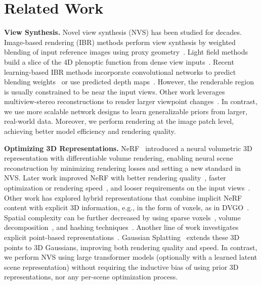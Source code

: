 
\vspace{-3mm}
\section{Related Work}
\label{related}
\vspace{-3mm}
\textbf{View Synthesis.} 
Novel view synthesis (NVS) has been studied for decades.
Image-based rendering (IBR) methods perform view synthesis by weighted blending of input reference images using proxy geometry~\citep{debevec2023modeling, heigl1999plenoptic, sinha2009piecewise}. Light field methods build a slice of the 4D plenoptic function from dense view inputs~\citep{gortler2023lumigraph, levoy2023light, davis2012unstructured}. Recent learning-based IBR methods incorporate convolutional networks to predict blending weights~\citep{hedman2018deep, zhou2016view, realestate10k_zhou2018stereo} or use predicted depth maps~\citep{choi2019extreme}. However, the renderable region is usually constrained to be near the input views. Other work leverages multiview-stereo reconstructions to render larger viewpoint changes~\citep{jancosek2011multi, chaurasia2013depth, penner2017soft}. 
In contrast, we use more scalable network designs to learn generalizable priors from larger, real-world data. Moreover, we perform rendering at the image patch level, achieving better model efficiency and rendering quality. 


\textbf{Optimizing 3D Representations.}
NeRF~\citep{mildenhall2020nerfrepresentingscenesneural} introduced a neural volumetric 3D representation with differentiable volume rendering, enabling neural scene reconstruction by minimizing rendering losses and setting a new standard in NVS.
Later work improved NeRF with better rendering quality~\citep{barron2021mipnerf, verbin2022refnerf, barron2023zipnerf}, faster optimization or rendering speed~\citep{reiser2021kilonerf, hedman2021baking, reiser2023merf}, and looser requirements on the input views~\citep{niemeyer2022regnerf, martin2021nerfinthewild, wang2021nerfmm}. 
Other work has explored hybrid representations that combine implicit NeRF content with explicit 3D information, e.g., in the form of voxels, as in DVGO~\citep{sun2022dvgo}. Spatial complexity can be further decreased by using sparse voxels~\citep{liu2020nsvf, fridovich2022plenoxels}, volume decomposition~\citep{chan2022eg3d, chen2022tensorf,chen2023factor}, and hashing techniques~\citep{M_ller_2022_instant_npg}. 
Another line of work investigates explicit point-based representations~\citep{xu2022pointnerf, zhang2022differentiablepoint, feng2022neuralpoints}. 
Gaussian Splatting~\citep{kerbl3Dgaussians} extends these 3D points to 3D Gaussians, improving both rendering quality and speed. In contrast, we perform NVS using large transformer models (optionally with a learned latent scene representation) without requiring the inductive bias of using prior 3D representations, nor any per-scene optimization process.

